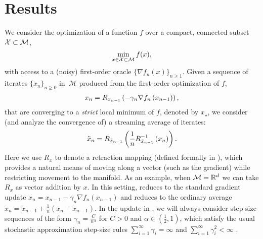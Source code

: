 \vspace{-1.6pt}
\section{Results} \label{sec:results}
\vspace{-1.22pt}
We consider the optimization of a function $f$ over a compact, connected subset $\mathcal{X} \subset \mathcal{M}$,
   \vspace*{-4pt} \[
\min_{x \in \X \subset \M} f(x),\vspace*{-6pt}
\] with access to a (noisy) first-order oracle $\{ \nabla f_n(x) \}_{n \geq 1}$. Given a sequence of iterates $\{x_n\}_{n\geq0}$  in~$\mathcal{M}$ produced from the first-order optimization of $f$,
\begin{align}
 x_{n} = R_{x_{n-1}} \left(-\gamma_n \nabla f_{n} \left(x_{n-1} \right)\right), \label{eq:grad_desc}\vspace*{-6pt}
\end{align}
that are converging to a \emph{strict} local minimum of $f$, denoted by $x_\star$, we consider (and analyze the convergence of) a streaming average of iterates:
\begin{align}
 \tilde{x}_{n} = R_{\tilde{x}_{n-1}} \left(\frac{1}{n} R_{\tilde{x}_{n-1}}^{-1}\left(x_{n}\right)\right). \label{eq:ave_grad_desc}\vspace*{-6pt}
\end{align}
Here we use $R_x$ to denote a retraction mapping (defined formally in ), which provides a natural means of moving along a vector (such as the gradient) while restricting movement to the manifold.
As an example, when $\mathcal{M} = \mathbb{R}^d$  we can take $R_x$ as vector addition by $x$. In this setting,  reduces to the standard gradient update $x_n = x_{n-1} - \gamma_n \nabla f_n(x_{n-1})$ and  reduces to the ordinary average $\tilde{x}_n = \tilde{x}_{n-1} + \frac{1}{n}(x_{n} - \tilde{x}_{n-1})$.
In the update in , we will always consider step-size sequences of the form $\gamma_n \!\!=\! \frac{C}{n^\alpha}$ for $C\!>\!0$ and $\alpha \in \left(\frac{1}{2}, 1\right)$, which satisfy the usual stochastic approximation step-size rules $\sum_{i=1}^\infty \!\gamma_i\!=\!\infty$ and $\sum_{i=1}^\infty \!\gamma_i^2\!<\!\!\infty$ \citep[see, e.g.,][]{BenPriMet90}.

